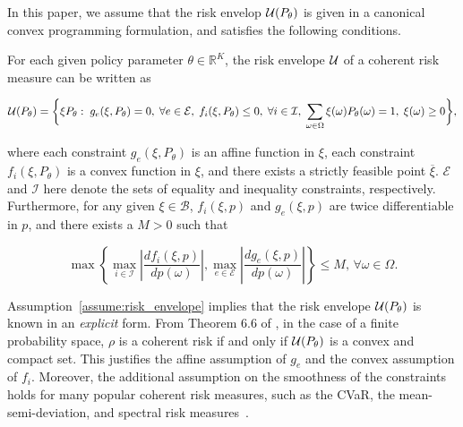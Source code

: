 \documentclass{article} %
\newcommand{\citet}{\cite}
\begin{document}
In this paper, we assume that the risk envelop ${\mathcal{U}}(P_\theta)$ is given in a canonical convex programming formulation, and satisfies the following conditions.
%
\begin{assumption}\label{assume:risk_envelope}
For each given policy parameter $\theta\in\mathbb R^K$, the risk envelope ${\mathcal{U}}$ of a coherent risk measure can be written as

\vspace{-0.25in}
\begin{small}
\begin{equation}\label{eq:U_as_optimization}
\mathcal U(P_{\theta})=\bigg\{\xi P_{\theta}:\;g_e(\xi,P_{\theta})=0,\;\forall e\in\mathcal E,
\;f_i(\xi,P_{\theta})\leq 0,\;\forall i\in\mathcal I,
\;\sum_{\omega\in\Omega}\xi(\omega)P_{\theta}(\omega)=1,\;\xi(\omega)\geq 0\bigg\},
\end{equation}
\end{small}
\vspace{-0.225in}

where each constraint $g_e(\xi,P_\theta)$ is an affine function in $\xi$, each constraint $f_i(\xi,P_\theta)$ is a convex function in $\xi$, and there exists a strictly feasible point $\overline\xi$. $\mathcal E$ and $\mathcal I$ here denote the sets of equality and inequality constraints, respectively. Furthermore, for any given $\xi\in\mathcal B$, $f_i({\xi},p)$ and $g_e({\xi},p)$ are twice differentiable in $p$, and there exists a $M>0$ such that

\begin{small}
\begin{equation*}
\max\left\{\max_{i\in\mathcal I}\left|\frac{ d f_i({\xi},p)}{d p(\omega)}\right|,\max_{e\in\mathcal E}\left|\frac{ d g_e({\xi},p)}{d p(\omega)}\right|\right\}\leq M,\,\forall \omega\in\Omega.
\end{equation*}
\end{small}
\end{assumption}
%
Assumption~\ref{assume:risk_envelope} implies that the risk envelope ${\mathcal{U}}(P_\theta)$ is known in an \emph{explicit} form. From Theorem 6.6 of \citet{Shapiro2009}, in the case of a finite probability space, $\rho$ is a coherent risk if and only if ${\mathcal{U}}(P_\theta)$ is a convex and compact set.
This justifies the affine assumption of $g_e$ and the convex assumption of $f_i$. Moreover, the additional assumption on the smoothness of the constraints holds for many popular coherent risk measures, such as the CVaR, the mean-semi-deviation, and spectral risk measures~\cite{acerbi2002spectral}.
\end{document}

